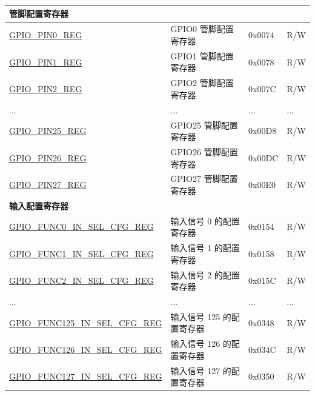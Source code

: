 \begin{longtable}{ | p{5.8cm} | p{7.2cm} | p{1.3cm} | p{2cm} | }
\multicolumn{4}{|l|}{\textbf{管脚配置寄存器}} \\ \hline
\hyperref[regdesc:GPIOPINNREG]{GPIO\_PIN0\_REG} & GPIO0 管脚配置寄存器 & 0x0074 & R/W \\ \hline
\hyperref[regdesc:GPIOPINNREG]{GPIO\_PIN1\_REG} & GPIO1 管脚配置寄存器 & 0x0078 & R/W \\ \hline
\hyperref[regdesc:GPIOPINNREG]{GPIO\_PIN2\_REG} & GPIO2 管脚配置寄存器 & 0x007C & R/W \\ \hline
...& ... & ... & ... \\ \hline
\hyperref[regdesc:GPIOPINNREG]{GPIO\_PIN25\_REG} & GPIO25 管脚配置寄存器 & 0x00D8 & R/W \\ \hline
\hyperref[regdesc:GPIOPINNREG]{GPIO\_PIN26\_REG} & GPIO26 管脚配置寄存器 & 0x00DC & R/W \\ \hline
\hyperref[regdesc:GPIOPINNREG]{GPIO\_PIN27\_REG} & GPIO27 管脚配置寄存器 & 0x00E0 & R/W \\ \hline

\multicolumn{4}{|l|}{\textbf{输入配置寄存器}} \\ \hline
\hyperref[regdesc:GPIOFUNCNINSELCFGREG]{GPIO\_FUNC0\_IN\_SEL\_CFG\_REG} & 输入信号 0 的配置寄存器 & 0x0154 & R/W \\ \hline
\hyperref[regdesc:GPIOFUNCNINSELCFGREG]{GPIO\_FUNC1\_IN\_SEL\_CFG\_REG} & 输入信号 1 的配置寄存器 & 0x0158 & R/W \\ \hline
\hyperref[regdesc:GPIOFUNCNINSELCFGREG]{GPIO\_FUNC2\_IN\_SEL\_CFG\_REG} & 输入信号 2 的配置寄存器 & 0x015C & R/W \\ \hline
...& ... & ... & ... \\ \hline
\hyperref[regdesc:GPIOFUNCNINSELCFGREG]{GPIO\_FUNC125\_IN\_SEL\_CFG\_REG} & 输入信号 125 的配置寄存器 & 0x0348 & R/W \\ \hline
\hyperref[regdesc:GPIOFUNCNINSELCFGREG]{GPIO\_FUNC126\_IN\_SEL\_CFG\_REG} & 输入信号 126 的配置寄存器 & 0x034C & R/W \\ \hline
\hyperref[regdesc:GPIOFUNCNINSELCFGREG]{GPIO\_FUNC127\_IN\_SEL\_CFG\_REG} & 输入信号 127 的配置寄存器 & 0x0350 & R/W \\ \hline


\end{longtable}

